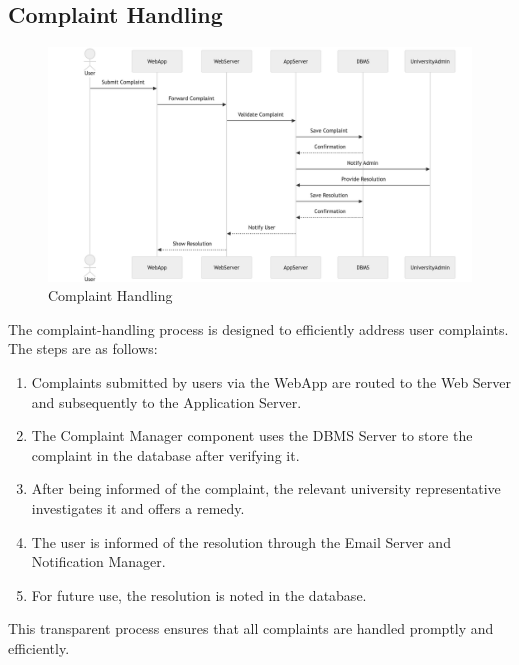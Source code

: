 \subsection{Complaint Handling}
\label{subsec:complaint_handling}
\begin{figure}[H]
    \begin{center}
        \includegraphics[width=0.82\linewidth]{JhaBhatiaSharma/imagesDD/ComplaintHandling.png}
        \caption{Complaint Handling}
        \label{fig:complainthandling}%
    \end{center}
\end{figure}
The complaint-handling process is designed to efficiently address user complaints. The steps are as follows:

\begin{enumerate}
    \item Complaints submitted by users via the WebApp are routed to the Web Server and subsequently to the Application Server.
    \item The Complaint Manager component uses the DBMS Server to store the complaint in the database after verifying it.
    \item After being informed of the complaint, the relevant university representative investigates it and offers a remedy.
    \item The user is informed of the resolution through the Email Server and Notification Manager.
    \item For future use, the resolution is noted in the database.
\end{enumerate}
This transparent process ensures that all complaints are handled promptly and efficiently.


